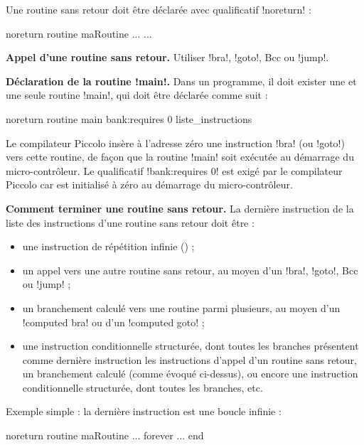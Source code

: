 Une routine sans retour doit être déclarée avec qualificatif \pic!noreturn! :
\begin{piccolo}
noreturn routine maRoutine ... {
  ...
}
\end{piccolo}

\textbf{Appel d’une routine sans retour.} Utiliser \pic!bra!, \pic!goto!, Bcc ou \pic!jump!.


\textbf{Déclaration de la routine \pic!main!.} Dans un programme, il doit exister une et une seule routine \pic!main!, qui doit être déclarée comme suit :

\begin{piccolo}
noreturn routine main bank:requires 0 {
   liste_instructions
}

\end{piccolo}

Le compilateur Piccolo insère à l’adresse zéro une instruction \pic!bra! (ou \pic!goto!) vers cette routine, de façon que la routine \pic!main! soit exécutée au démarrage du micro-contrôleur. Le qualificatif \pic!bank:requires 0! est exigé par le compilateur Piccolo car  est initialisé à zéro au démarrage du micro-contrôleur.


\textbf{Comment terminer une routine sans retour.} La dernière instruction de la liste des instructions d’une routine sans retour doit être :
\begin{itemize}
  \item une instruction de répétition infinie () ;
  \item un appel vers une autre routine sans retour, au moyen d’un \pic!bra!, \pic!goto!, Bcc ou \pic!jump! ;
  \item un branchement calculé vers une routine parmi plusieurs, au moyen d’un \pic!computed bra! ou d’un \pic!computed goto! ;
  \item une instruction conditionnelle structurée, dont toutes les branches présentent comme dernière instruction les instructions d’appel d’un routine sans retour, un branchement calculé (comme évoqué ci-dessus), ou encore une instruction conditionnelle structurée, dont toutes les branches, etc.

\end{itemize}

Exemple simple : la dernière instruction est une boucle infinie :
\begin{piccolo}
noreturn routine maRoutine {
  ...
  forever
    ...
  end
}
\end{piccolo}

